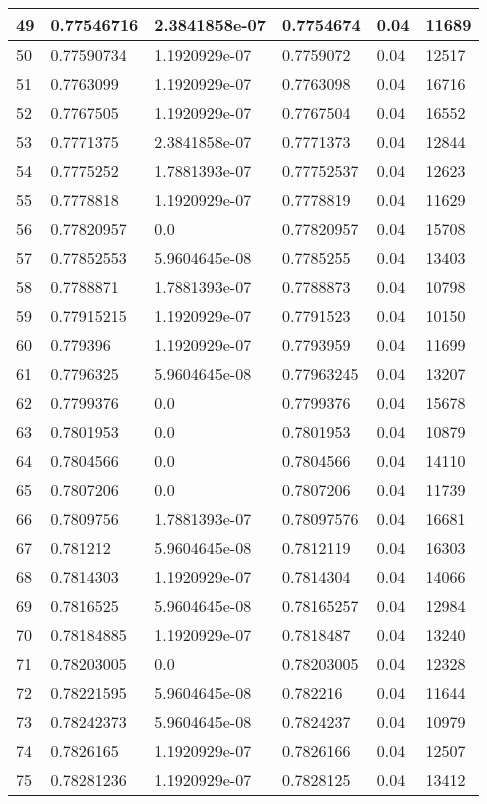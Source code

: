 \begin{longtable}{|l|l|l|l|l|l|}
49 & 0.77546716 & 2.3841858e-07 & 0.7754674 & 0.04 & 11689 \\ \hline 
50 & 0.77590734 & 1.1920929e-07 & 0.7759072 & 0.04 & 12517 \\ \hline 
51 & 0.7763099 & 1.1920929e-07 & 0.7763098 & 0.04 & 16716 \\ \hline 
52 & 0.7767505 & 1.1920929e-07 & 0.7767504 & 0.04 & 16552 \\ \hline 
53 & 0.7771375 & 2.3841858e-07 & 0.7771373 & 0.04 & 12844 \\ \hline 
54 & 0.7775252 & 1.7881393e-07 & 0.77752537 & 0.04 & 12623 \\ \hline 
55 & 0.7778818 & 1.1920929e-07 & 0.7778819 & 0.04 & 11629 \\ \hline 
56 & 0.77820957 & 0.0 & 0.77820957 & 0.04 & 15708 \\ \hline 
57 & 0.77852553 & 5.9604645e-08 & 0.7785255 & 0.04 & 13403 \\ \hline 
58 & 0.7788871 & 1.7881393e-07 & 0.7788873 & 0.04 & 10798 \\ \hline 
59 & 0.77915215 & 1.1920929e-07 & 0.7791523 & 0.04 & 10150 \\ \hline 
60 & 0.779396 & 1.1920929e-07 & 0.7793959 & 0.04 & 11699 \\ \hline 
61 & 0.7796325 & 5.9604645e-08 & 0.77963245 & 0.04 & 13207 \\ \hline 
62 & 0.7799376 & 0.0 & 0.7799376 & 0.04 & 15678 \\ \hline 
63 & 0.7801953 & 0.0 & 0.7801953 & 0.04 & 10879 \\ \hline 
64 & 0.7804566 & 0.0 & 0.7804566 & 0.04 & 14110 \\ \hline 
65 & 0.7807206 & 0.0 & 0.7807206 & 0.04 & 11739 \\ \hline 
66 & 0.7809756 & 1.7881393e-07 & 0.78097576 & 0.04 & 16681 \\ \hline 
67 & 0.781212 & 5.9604645e-08 & 0.7812119 & 0.04 & 16303 \\ \hline 
68 & 0.7814303 & 1.1920929e-07 & 0.7814304 & 0.04 & 14066 \\ \hline 
69 & 0.7816525 & 5.9604645e-08 & 0.78165257 & 0.04 & 12984 \\ \hline 
70 & 0.78184885 & 1.1920929e-07 & 0.7818487 & 0.04 & 13240 \\ \hline 
71 & 0.78203005 & 0.0 & 0.78203005 & 0.04 & 12328 \\ \hline 
72 & 0.78221595 & 5.9604645e-08 & 0.782216 & 0.04 & 11644 \\ \hline 
73 & 0.78242373 & 5.9604645e-08 & 0.7824237 & 0.04 & 10979 \\ \hline 
74 & 0.7826165 & 1.1920929e-07 & 0.7826166 & 0.04 & 12507 \\ \hline 
75 & 0.78281236 & 1.1920929e-07 & 0.7828125 & 0.04 & 13412 \\ \hline 
\end{longtable}
